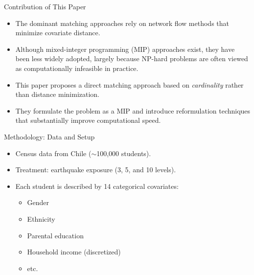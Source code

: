 \documentclass{beamer}
\begin{document}
\begin{frame}{Contribution of This Paper}

\begin{itemize}
    \item The dominant matching approaches rely on network flow methods that minimize covariate distance.
    
    \item Although mixed-integer programming (MIP) approaches exist, they have been less widely adopted, largely because NP-hard problems are often viewed as computationally infeasible in practice.
    
    \item This paper proposes a direct matching approach based on \textit{cardinality} rather than distance minimization.
    
    \item They formulate the problem as a MIP and introduce reformulation techniques that substantially improve computational speed.
\end{itemize}

\end{frame}

\begin{frame}{Methodology: Data and Setup}

\begin{itemize}
    \item Census data from Chile (\(\sim\)100,000 students).
    \item Treatment: earthquake exposure (3, 5, and 10 levels).
    \item Each student is described by 14 categorical covariates:
    \begin{itemize}
        \item Gender
        \item Ethnicity
        \item Parental education
        \item Household income (discretized)
        \item etc.
    \end{itemize}
\end{itemize}

\end{frame}
\end{document}
